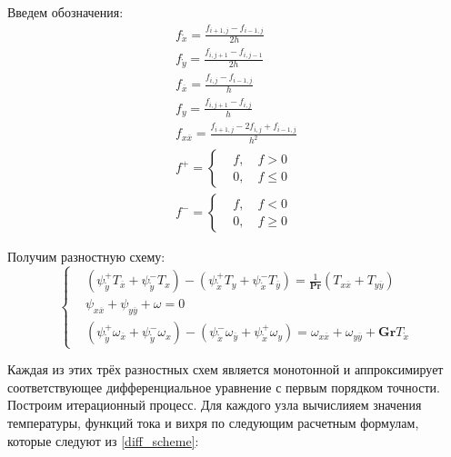 \documentclass[a4paper, 12pt]{article}
\newcommand{\Pra}{\mathbf{Pr}}
\newcommand{\Gra}{\mathbf{Gr}}
\newcommand{\psp}[2]{\psi_{\mathring{#1}}^{#2}}
\begin{document}
    Введем обозначения:
    \begin{gather*}
      f_{\mathring{x}} = \frac{f_{i+1,j} - f_{i-1,j}}{2 h}
      \\
      f_{\mathring{y}} = \frac{f_{i,j+1} - f_{i,j-1}}{2 h}
      \\
      f_{\overline{x}} = \frac{f_{i,j} - f_{i-1,j}}{h}
      \\
      f_{y} = \frac{f_{i,j+1} - f_{i,j}}{h}
      \\
      f_{x \overline{x}} = \frac{f_{i+1,j} - 2 f_{i,j} + f_{i-1,j}}{h^2}
      \\
      f^{+} = \left\{
        \begin{aligned}
          &f, \quad f > 0\\
          &0, \quad f \leq 0
        \end{aligned}
      \right.
      \\
      f^{-} = \left\{
        \begin{aligned}
          &f, \quad f < 0\\
          &0, \quad f \geq 0
        \end{aligned}
      \right.
    \end{gather*}

    Получим разностную схему:
    \begin{equation}
      \left\{
        \begin{aligned}
          &\left( \psp{y}{+} T_{\overline{x}} + \psp{y}{-} T_{x} \right) -
            \left( \psp{x}{+} T_{y} + \psp{x}{-} T_{\overline{y}} \right) =
            \frac{1}{\Pra}\left( T_{x \overline{x}} + T_{y \overline{y}} \right)
          \\
          &\psi_{x \overline{x}} + \psi_{y \overline{y}} + \omega = 0
          \\
          &\left(
            \psp{y}{+} \omega_{\overline{x}} + \psp{y}{-} \omega_{x}
          \right) - \left(
            \psp{x}{-} \omega_{\overline{y}} + \psp{x}{+} \omega_{y}
          \right) =
            \omega_{x \overline{x}} + \omega_{y \overline{y}} +
            \Gra T_{\mathring{x}}
        \end{aligned}
      \right.\label{diff_scheme}
    \end{equation}

    Каждая из этих трёх разностных схем является монотонной и аппроксимирует
    соответствующее дифференциальное уравнение с первым порядком точности.
    Построим итерационный процесс. Для каждого узла вычислияем значения
    температуры, функций тока и вихря по следующим расчетным формулам, которые
    следуют из \eqref{diff_scheme}:
\end{document}
